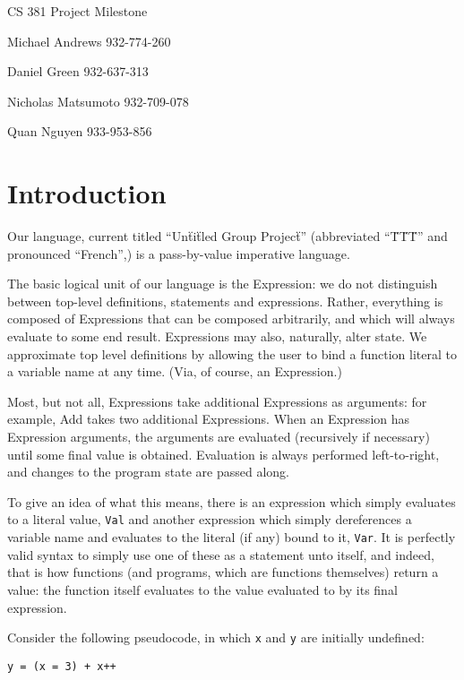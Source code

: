 \documentclass{article}
\begin{document}
\begin{flushleft}
CS 381 Project Milestone

Michael Andrews 932-774-260

Daniel Green 932-637-313 

Nicholas Matsumoto 932-709-078

Quan Nguyen 933-953-856
\end{flushleft}

\section*{Introduction}

Our language, current titled ``Un\"ti\"tled Group Projec\"t'' (abbreviated ``\"T\"T\"T'' and pronounced ``French'',) is a pass-by-value imperative language.

The basic logical unit of our language is the Expression: we do not distinguish between top-level definitions, statements and expressions.  Rather, everything is composed of Expressions that can be composed arbitrarily, and which will always evaluate to some end result.  Expressions may also, naturally, alter state.  We approximate top level definitions by allowing the user to bind a function literal to a variable name at any time.  (Via, of course, an Expression.)

Most, but not all, Expressions take additional Expressions as arguments: for example, Add takes two additional Expressions.  When an Expression has Expression arguments, the arguments are evaluated (recursively if necessary) until some final value is obtained.  Evaluation is always performed left-to-right, and changes to the program state are passed along.

To give an idea of what this means, there is an expression which simply evaluates to a literal value, \texttt{Val} and another expression which simply dereferences a variable name and evaluates to the literal (if any) bound to it, \texttt{Var}.  It is perfectly valid syntax to simply use one of these as a statement unto itself, and indeed, that is how functions (and programs, which are functions themselves) return a value: the function itself evaluates to the value evaluated to by its final expression.

Consider the following pseudocode, in which \texttt{x} and \texttt{y} are initially undefined:

\begin{lstlisting}
y = (x = 3) + x++
\end{lstlisting}
\end{document}
